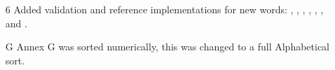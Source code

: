 
	\begin{enumerate}
	\item[6] Added validation and reference implementations for new words:
		,
		,
		,
		,
		,
		,
		 and
		.

	\item[G] Annex G was sorted numerically, this was changed to a full
		Alphabetical sort.
	\end{enumerate}


